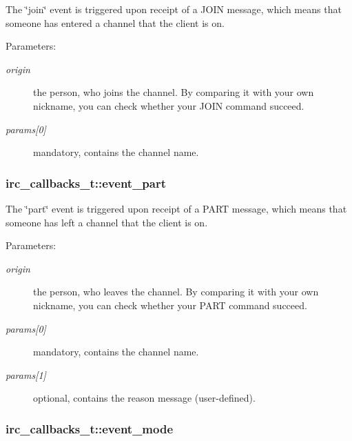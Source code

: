 The \char`\"{}join\char`\"{} event is triggered upon receipt of a JOIN message, which means that someone has entered a channel that the client is on.

\begin{Desc}
\item[Parameters:]
\begin{description}
\item[{\em origin}]the person, who joins the channel. By comparing it with your own nickname, you can check whether your JOIN command succeed. \item[{\em params\mbox{[}0\mbox{]}}]mandatory, contains the channel name. \end{description}
\end{Desc}
\hypertarget{structirc__callbacks__t_0076faaabcf638dba3f08c2048956621}{
\subsubsection[event\_\-part]{ {\bf irc\_\-callbacks\_\-t::event\_\-part}}}
\label{structirc__callbacks__t_0076faaabcf638dba3f08c2048956621}


The \char`\"{}part\char`\"{} event is triggered upon receipt of a PART message, which means that someone has left a channel that the client is on.

\begin{Desc}
\item[Parameters:]
\begin{description}
\item[{\em origin}]the person, who leaves the channel. By comparing it with your own nickname, you can check whether your PART command succeed. \item[{\em params\mbox{[}0\mbox{]}}]mandatory, contains the channel name. \item[{\em params\mbox{[}1\mbox{]}}]optional, contains the reason message (user-defined). \end{description}
\end{Desc}
\hypertarget{structirc__callbacks__t_3d7add398f78ad0a3c5d96133411d60a}{
\subsubsection[event\_\-mode]{ {\bf irc\_\-callbacks\_\-t::event\_\-mode}}}
\label{structirc__callbacks__t_3d7add398f78ad0a3c5d96133411d60a}


